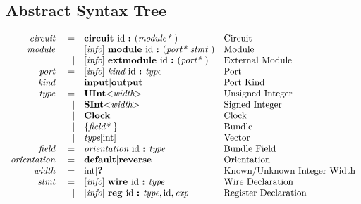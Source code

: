 \documentclass[12pt]{article}
\begin{document}
\subsection{Abstract Syntax Tree}
{ \fontsize{11pt}{1.15em}\selectfont
\[
\begin{array}{rrll}
\text{\em circuit\ }    &=     &\text{\bf circuit\ } \text{id } \text{\bf :\ } (\text{\em module*\ })                                        &\text{Circuit}\\
\text{\em module\ }     &=     &[\text{\em info}]\  \text{\bf module\ }  \text{id } \text{\bf :\ } (\text{\em port*\ } \text{\em stmt\ })                          &\text{Module}\\
                &\vert &[\text{\em info}]\  \text{\bf extmodule\ }  \text{id } \text{\bf :\ } (\text{\em port*\ })                                 &\text{External Module}\\
\text{\em port\ }       &=     &[\text{\em info}]\  \text{\em kind\ } \text{id } \text{\bf :\ } \text{\em type\ }                                          &\text{Port}\\
\text{\em kind\ }       &=     &\text{\bf input} \vert \text{\bf output}                                                &\text{Port Kind}\\
\text{\em type\ }       &=     &\text{\bf UInt} \text{\bf $<$} \text{\em width} \text{\bf $>$}                                    &\text{Unsigned Integer}\\
                &\vert &\text{\bf SInt} \text{\bf $<$} \text{\em width} \text{\bf $>$}                                    &\text{Signed Integer}\\
                &\vert &\text{\bf Clock}                                                                   &\text{Clock}\\
                &\vert &\{\text{\em field*\ }\}                                                         &\text{Bundle}\\
                &\vert &\text{\em type}[\text{int}]                                                             &\text{Vector}\\
\text{\em field\ }      &=     &\text{\em orientation\ } \text{id } \text{\bf :\ } \text{\em type\ }                                         &\text{Bundle Field}\\
\text{\em orientation\ }&=     &\text{\bf default} \vert \text{\bf reverse}                                             &\text{Orientation}\\
\text{\em width\ }      &=     &\text{int} \vert \text{\bf ?\ }                                                            &\text{Known/Unknown Integer Width}\\
\text{\em stmt\ }       &=     &[\text{\em info}]\  \text{\bf wire\ } \text{id } \text{\bf :\ } \text{\em type\ }                                          &\text{Wire Declaration}\\
                &\vert &[\text{\em info}]\  \text{\bf reg\ } \text{id } \text{\bf :\ }  \text{\em type} , \text{id} , \text{\em exp}                      &\text{Register Declaration}\\

\end{array}\]}
\end{document}

